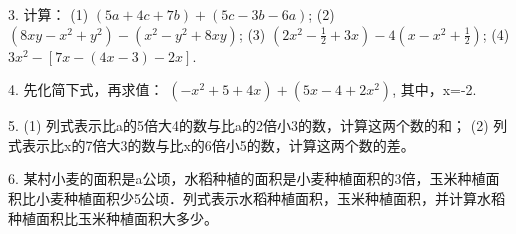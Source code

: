\documentclass{article}
\begin{document}
\begin{article}
\begin{exercise}
         	3. 计算：
            (1) $(5a+4c+7b)+(5c-3b-6a)$;         (2)$(8xy-x^2+y^2)-(x^2-y^2+8xy)$;
            (3) $(2x^2-\frac{1}{2}+3x)-4(x-x^2+\frac{1}{2})$;    (4) $3x^2-[7x-(4x-3)-2x]$.
            
            4. 先化简下式，再求值：
                     $(-x^2+5+4x)+(5x-4+2x^2)$,
                其中，x=-2.
            
            5. (1) 列式表示比a的5倍大4的数与比a的2倍小3的数，计算这两个数的和；
               (2) 列式表示比x的7倍大3的数与比x的6倍小5的数，计算这两个数的差。
            
            6. 某村小麦的面积是a公顷，水稻种植的面积是小麦种植面积的3倍，玉米种植面积比小麦种植面积少5公顷．列式表示水稻种植面积，玉米种植面积，并计算水稻种植面积比玉米种植面积大多少。
          	
         \end{exercise}
	\end{article}
\end{document}
